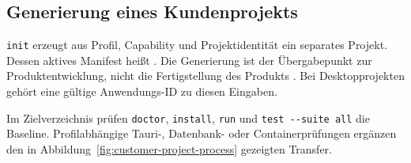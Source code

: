 \subsection{Generierung eines Kundenprojekts}
\label{subsec:generierung-kundenprojekt}

\texttt{init} erzeugt aus Profil, Capability und Projektidentität ein separates
Projekt. Dessen aktives Manifest heißt . Die
Generierung ist der Übergabepunkt zur Produktentwicklung, nicht die
Fertigstellung des Produkts
\parencite{kleiveist2026tooling,kleiveist2026profiles}.
Bei Desktopprojekten gehört eine gültige Anwendungs-ID zu diesen Eingaben.

Im Zielverzeichnis prüfen \texttt{doctor}, \texttt{install}, \texttt{run} und
\texttt{test {-}{-}suite all} die Baseline. Profilabhängige Tauri-, Datenbank-
oder Containerprüfungen ergänzen den in
Abbildung~\ref{fig:customer-project-process} gezeigten Transfer.


